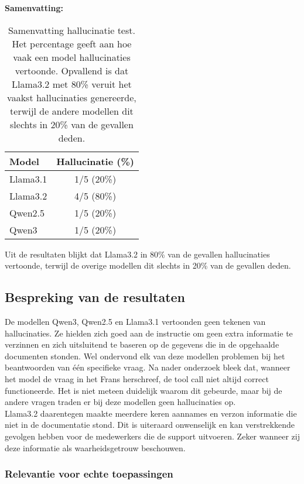 \noindent\textbf{Samenvatting:}  
\begin{table}[H]
    \begin{tabular}{|l|c|}
        \hline
        \textbf{Model} & \textbf{Hallucinatie (\%)} \\
        \hline
        Llama3.1 & 1/5 (20\%) \\
        Llama3.2 & 4/5 (80\%) \\
        Qwen2.5  & 1/5 (20\%) \\
        Qwen3    & 1/5 (20\%) \\
        \hline
    \end{tabular}
    \caption{Samenvatting hallucinatie test. Het percentage geeft aan hoe vaak een model hallucinaties vertoonde. Opvallend is dat Llama3.2 met 80\% veruit het vaakst hallucinaties genereerde, terwijl de andere modellen dit slechts in 20\% van de gevallen deden.}
\end{table}

Uit de resultaten blijkt dat Llama3.2 in 80\% van de gevallen hallucinaties vertoonde, terwijl de overige modellen dit slechts in 20\% van de gevallen deden.

\subsection{Bespreking van de resultaten}

De modellen Qwen3, Qwen2.5 en Llama3.1 vertoonden geen tekenen van hallucinaties. Ze hielden zich goed aan de instructie om geen extra informatie te verzinnen en zich uitsluitend te baseren op de gegevens die in de opgehaalde documenten stonden. Wel ondervond elk van deze modellen problemen bij het beantwoorden van één specifieke vraag. Na nader onderzoek bleek dat, wanneer het model de vraag in het Frans herschreef, de tool call niet altijd correct functioneerde. Het is niet meteen duidelijk waarom dit gebeurde, maar bij de andere vragen traden er bij deze modellen geen hallucinaties op.
\\[1em]
Llama3.2 daarentegen maakte meerdere keren aannames en verzon informatie die niet in de documentatie stond. Dit is uiteraard onwenselijk en kan verstrekkende gevolgen hebben voor de medewerkers die de support uitvoeren. Zeker wanneer zij deze informatie als waarheidsgetrouw beschouwen.

\subsubsection{Relevantie voor echte toepassingen}


